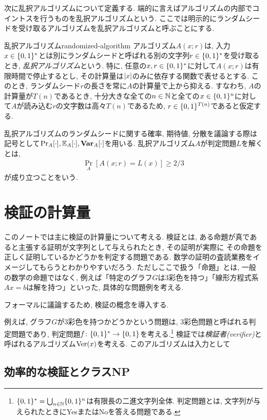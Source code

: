 次に乱択アルゴリズムについて定義する. 端的に言えばアルゴリズムの内部でコイントスを行うものを乱択アルゴリズムという.
ここでは明示的にランダムシードを受け取るアルゴリズムを乱択アルゴリズムと呼ぶことにする.

\begin{definition}{乱択アルゴリズム}{randomized-algorithm}
  アルゴリズム$A(x;r)$は, 入力$x\in\{0,1\}^*$とは別にランダムシードと呼ばれる別の文字列$r\in\{0,1\}^*$を受け取るとき, \emph{乱択アルゴリズム}という.
  特に, 任意の$x,r\in\{0,1\}^*$に対して$A(x;r)$は有限時間で停止するとし, その計算量は$\lvert x\rvert$のみに依存する関数で表せるとする.
  このとき, ランダムシード$r$の長さを常に$A$の計算量で上から抑える.
  すなわち, $A$の計算量が$T(n)$であるとき, 十分大きな全ての$n\in\mathbb{N}$と全ての$x\in\{0,1\}^n$に対して$A$が読み込む$r$の文字数は高々$T(n)$であるため, $r\in \{0,1\}^{T(n)}$であると仮定する.

  乱択アルゴリズムのランダムシードに関する確率, 期待値, 分散を議論する際は記号として$\Pr_{A}[\cdot],\operatorname*{\mathbb{E}}_A[\cdot],\operatorname*{\mathbf{Var}}_A[\cdot]$を用いる.
  乱択アルゴリズム$A$が判定問題$L$を解くとは,
  \begin{align*}
    \Pr_A[A(x;r)=L(x)]\geq 2/3
  \end{align*}
  が成り立つことをいう.
\end{definition}

\section{検証の計算量}
このノートでは主に検証の計算量について考える.
検証とは, ある命題が真であると主張する証明が文字列として与えられたとき, その証明が実際に
その命題を正しく証明しているかどうかを判定する問題である.
数学の証明の査読業務をイメージしてもらうとわかりやすいだろう.
ただしここで扱う「命題」とは, 一般の数学の命題ではなく, 例えば「特定のグラフ$G$は3彩色を持つ」「線形方程式系$Ax=b$は解を持つ」といった, 具体的な問題例を考える.

フォーマルに議論するため, 検証の概念を導入する.

例えば, グラフ$G$が3彩色を持つかどうかという問題は, 3彩色問題と呼ばれる判定問題であり,
判定問題$f\colon\{0,1\}^*\to\{0,1\}$を考える.\footnote{$\{0,1\}^*=\bigcup_{n\in\mathbb{N}}\{0,1\}^n$は有限長の二進文字列全体. 判定問題とは, 文字列が与えられたときにYesまたはNoを答える問題である.}
検証では\emph{検証者(verifier)}と呼ばれるアルゴリズム$\mathrm{Ver}(x)$を考える.
このアルゴリズムは入力として

\subsection{効率的な検証とクラスNP}
